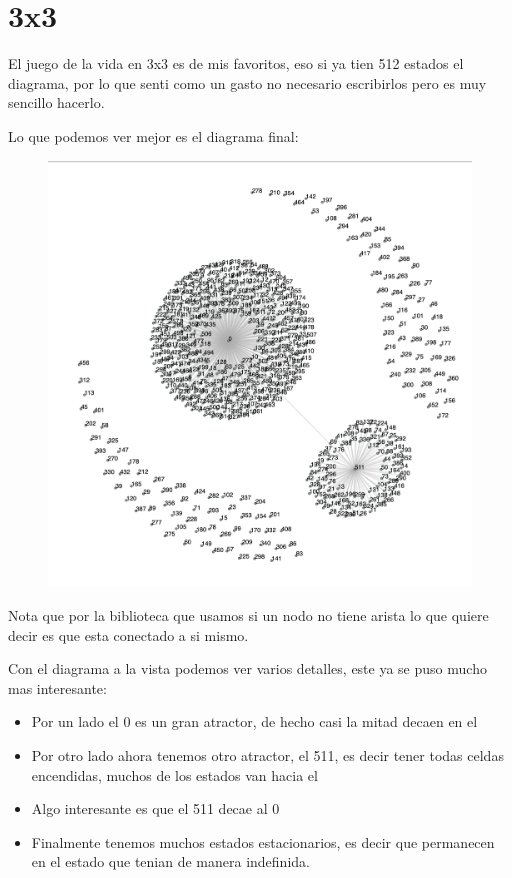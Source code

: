 \documentclass[12pt, fleqn]{report}                             %
\theoremstyle{break}                                            %
\begin{document}
      \clearpage
      \section{3x3}

        El juego de la vida en 3x3 es de mis favoritos, eso si ya tien 512 estados el diagrama, por
        lo que senti como un gasto no necesario escribirlos pero es muy sencillo hacerlo.

        Lo que podemos ver mejor es el diagrama final:
        \begin{figure}[ht!]
          \centering
          \includegraphics[height=\textwidth]{3life.png}
        \end{figure}

        Nota que por la biblioteca que usamos si un nodo no tiene arista lo que
        quiere decir es que esta conectado a si mismo.

        Con el diagrama a la vista podemos ver varios detalles, este ya se puso mucho mas interesante:
        \begin{itemize}
          \item Por un lado el 0 es un gran atractor, de hecho casi la mitad decaen en el
          \item Por otro lado ahora tenemos otro atractor, el 511, es decir tener todas celdas encendidas, muchos
          de los estados van hacia el
          \item Algo interesante es que el 511 decae al 0
          \item Finalmente tenemos muchos estados estacionarios, es decir que permanecen en el estado que tenian
          de manera indefinida.
        \end{itemize}
\end{document}
